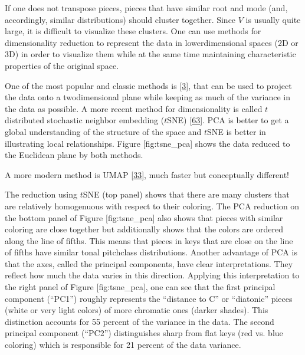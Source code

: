 \documentclass[letterpaper,10pt,english]{sphinxmanual}
\begin{document}
\sphinxAtStartPar
If one does not transpose pieces, pieces that have similar root and mode
(and, accordingly, similar distributions) should cluster together. Since
\(V\) is usually quite large, it is difficult to visualize these
clusters. One can use methods for dimensionality reduction to represent
the data in lower\sphinxhyphen{}dimensional spaces (2D or 3D) in order to visualize
them while at the same time maintaining characteristic properties of the
original space.

\sphinxAtStartPar
One of the most popular and classic methods is  {[}\hyperlink{cite.8_bibliography:id70}{3}{]}, that can be used to project
the data onto a two\sphinxhyphen{}dimensional plane while keeping as much of the
variance in the data as possible. A more recent method for
dimensionality is called \(t\)\sphinxhyphen{}distributed stochastic neighbor
embedding (\(t\)\sphinxhyphen{}SNE) {[}\hyperlink{cite.8_bibliography:id72}{63}{]}. PCA is
better to get a global understanding of the structure of the space and
\(t\)\sphinxhyphen{}SNE is better in illustrating local relationships. Figure
{[}fig:tsne\_pca{]} shows the data reduced to the Euclidean plane by both
methods.

\sphinxAtStartPar
A more modern method is UMAP {[}\hyperlink{cite.8_bibliography:id71}{33}{]}, much faster but conceptually different!

\sphinxAtStartPar
The reduction using \(t\)\sphinxhyphen{}SNE (top panel) shows that there are many
clusters that are relatively homogenuous with respect to their coloring.
The PCA reduction on the bottom panel of Figure {[}fig:tsne\_pca{]} also
shows that pieces with similar coloring are close together but
additionally shows that the colors are ordered along the line of fifths.
This means that pieces in keys that are close on the line of fifths have
similar tonal pitch\sphinxhyphen{}class distributions. Another advantage of PCA is
that the axes, called the principal components, have clear
interpretations. They reflect how much the data varies in this
direction. Applying this interpretation to the right panel of Figure
{[}fig:tsne\_pca{]}, one can see that the first principal component (“PC1”)
roughly represents the “distance to C” or “diatonic” pieces (white or
very light colors) of more chromatic ones (darker shades). This
distinction accounts for 55 percent of the variance in the data. The
second principal component (“PC2”) distinguishes sharp from flat keys
(red vs. blue coloring) which is responsible for 21 percent of the data
variance.
\end{document}
